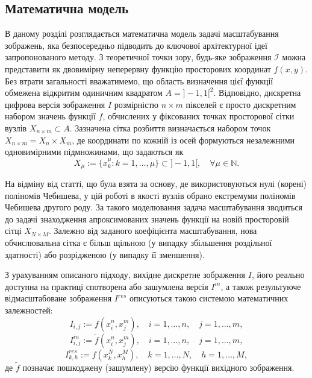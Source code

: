 \subsection{Математична модель}
В даному розділі розглядається математична модель задачі масштабування зображень, яка безпосередньо підводить до ключової архітектурної ідеї запропонованого методу. З теоретичної точки зору, будь-яке зображення $\mathcal{I}$ можна представити як двовимірну неперервну функцію просторових координат $f(x, y)$. Без втрати загальності вважатимемо, що область визначення цієї функції обмежена відкритим одиничним квадратом $A = ]-1, 1[^2$. Відповідно, дискретна цифрова версія зображення $I$ розмірністю $n \times m$ пікселей є просто дискретним набором значень функції $f$, обчислених у фіксованих точках просторової сітки вузлів $X_{n \times m} \subset A$. Зазначена сітка розбиття визначається набором точок $X_{n \times m} = X_n \times X_m$, де координати по кожній із осей формуються незалежними одновимірними підмножинами, що задаються як
\begin{equation}\tag{1}
	X_\mu := \{x_k^\mu : k = 1, \dots, \mu\} \subset ]-1, 1[, \quad \forall \mu \in \mathbb{N}.
\end{equation}

На відміну від статті, що була взята за основу, де використовуються нулі (корені) поліномів Чебишева, у цій роботі в якості вузлів обрано екстремуми поліномів Чебишева другого роду. За такого моделювання задача масштабування зводиться до задачі знаходження апроксимованих значень функції на новій просторовій сітці $X_{N \times M}$. Залежно від заданого коефіцієнта масштабування, нова обчислювальна сітка є більш щільною (у випадку збільшення роздільної здатності) або розрідженою (у випадку її зменшення).

З урахуванням описаного підходу, вихідне дискретне зображення $I$, його реально доступна на практиці спотворена або зашумлена версія $I^{in}$, а також результуюче відмасштабоване зображення $I^{res}$ описуються такою системою математичних залежностей:
\begin{equation}\tag{6}
	I_{i,j} := f(x_i^n, x_j^m), \quad i = 1, \dots, n, \quad j = 1, \dots, m,
\end{equation}
\begin{equation}\tag{7}
	I_{i,j}^{in} := \tilde{f}(x_i^n, x_j^m), \quad i = 1, \dots, n, \quad j = 1, \dots, m,
\end{equation}
\begin{equation}\tag{8}
	I_{k,h}^{res} := f(x_k^N, x_h^M), \quad k = 1, \dots, N, \quad h = 1, \dots, M,
\end{equation}
де $\tilde{f}$ позначає пошкоджену (зашумлену) версію функції вихідного зображення.


